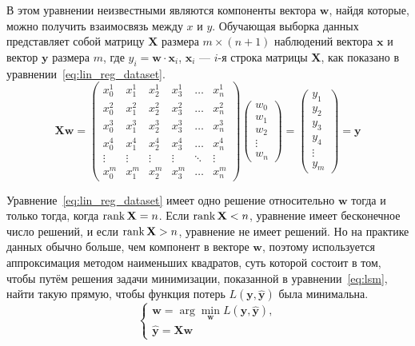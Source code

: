 В этом уравнении неизвестными являются компоненты вектора $\mathbf{w}$, найдя которые, можно получить взаимосвязь между $x$ и $y$. Обучающая выборка данных представляет собой матрицу $\mathbf{X}$ размера $m \times (n+1)$ наблюдений вектора $\mathbf{x}$ и вектор $\mathbf{y}$ размера $m$, где $y_i=\mathbf{w} \cdot \mathbf{x}_i$, $\mathbf{x}_i$ --- $i$-я строка матрицы $\mathbf{X}$, как показано в уравнении \ref*{eq:lin_reg_dataset}.
\begin{equation}
    \label{eq:lin_reg_dataset}
    \mathbf{X}\mathbf{w}=
    \left(\begin{matrix}
        x_0^1 & x_1^1 & x_2^1 & x_3^1 & \dots & x_n^1 \\
        x_0^2 & x_1^2 & x_2^2 & x_3^2 & \dots & x_n^2 \\
        x_0^3 & x_1^3 & x_2^3 & x_3^3 & \dots & x_n^3 \\
        x_0^4 & x_1^4 & x_2^4 & x_3^4 & \dots & x_n^4 \\
        \vdots & \vdots & \vdots & \vdots & \ddots & \vdots \\
        x_0^m & x_1^m & x_2^m & x_3^m & \dots & x_n^m
    \end{matrix}\right)
    \left(\begin{matrix}
        w_0 \\
        w_1 \\
        w_2 \\
        \vdots \\
        w_n
    \end{matrix}\right)=
    \left(\begin{matrix}
        y_1 \\
        y_2 \\
        y_3 \\
        y_4 \\
        \vdots \\
        y_m
    \end{matrix}\right)=\mathbf{y}
\end{equation}

Уравнение \ref*{eq:lin_reg_dataset} имеет одно решение относительно $\mathbf{w}$ тогда и только тогда, когда $\operatorname{rank} \mathbf{X} = n$. Если $\operatorname{rank} \mathbf{X} < n$, уравнение имеет бесконечное число решений, и если $\operatorname{rank} \mathbf{X} > n$, уравнение не имеет решений. Но на практике данных обычно больше, чем компонент в векторе $\mathbf{w}$, поэтому используется аппроксимация методом наименьших квадратов, суть которой состоит в том, чтобы путём решения задачи минимизации, показанной в уравнении \ref*{eq:lsm}, найти такую прямую, чтобы функция потерь $L(\mathbf{y},\hat{\mathbf{y}})$ была минимальна.
\begin{equation}
    \label{eq:lsm}
    \begin{cases}
        \mathbf{w} = \arg\min\limits_\mathbf{w} L(\mathbf{y},\hat{\mathbf{y}}), \\
        \hat{\mathbf{y}}=\mathbf{X}\mathbf{w}
    \end{cases}
\end{equation}

